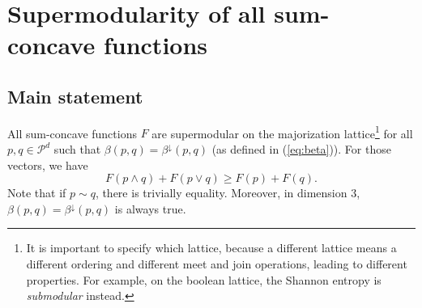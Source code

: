 \section{Supermodularity of all sum-concave functions} \label{sec:alternative_supermodularity}

\subsection{Main statement}

\begin{theorem} \label{th:alternative_supermodularity}
    All sum-concave functions $F$ are supermodular on the majorization lattice\footnote{It is important to specify which lattice, because a different lattice means a different ordering and different meet and join operations, leading to different properties. For example, on the boolean lattice, the Shannon entropy is \textit{submodular} instead.} for all $p, q \in \mathcal{P}^d$ such that $\beta(p, q) = \beta^\downarrow(p, q)$ (as defined in (\ref{eq:beta})). For those vectors, we have
    \begin{equation} \label{eq:supermodularity}
        F(p \wedge q) + F(p \vee q) \geq F(p) + F(q).
    \end{equation}
    Note that if $p \sim q$, there is trivially equality. Moreover, in dimension 3, $\beta(p, q) = \beta^\downarrow(p, q)$ is always true.
\end{theorem}

